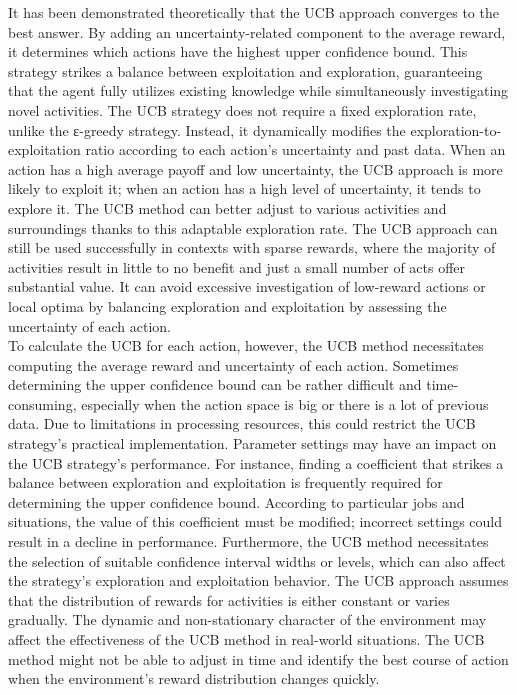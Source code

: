 \documentclass[a4paper,11pt,onecolumn]{article}
\begin{document}
It has been demonstrated theoretically that the UCB approach converges to the best answer. By adding an uncertainty-related component to the average reward, it determines which actions have the highest upper confidence bound. This strategy strikes a balance between exploitation and exploration, guaranteeing that the agent fully utilizes existing knowledge while simultaneously investigating novel activities. The UCB strategy does not require a fixed exploration rate, unlike the ε-greedy strategy.  Instead, it dynamically modifies the exploration-to-exploitation ratio according to each action's uncertainty and past data. When an action has a high average payoff and low uncertainty, the UCB approach is more likely to exploit it; when an action has a high level of uncertainty, it tends to explore it. The UCB method can better adjust to various activities and surroundings thanks to this adaptable exploration rate. The UCB approach can still be used successfully in contexts with sparse rewards, where the majority of activities result in little to no benefit and just a small number of acts offer substantial value. It can avoid excessive investigation of low-reward actions or local optima by balancing exploration and exploitation by assessing the uncertainty of each action.\\
To calculate the UCB for each action, however, the UCB method necessitates computing the average reward and uncertainty of each action. Sometimes determining the upper confidence bound can be rather difficult and time-consuming, especially when the action space is big or there is a lot of previous data. Due to limitations in processing resources, this could restrict the UCB strategy's practical implementation.  Parameter settings may have an impact on the UCB strategy's performance. For instance, finding a coefficient that strikes a balance between exploration and exploitation is frequently required for determining the upper confidence bound. According to particular jobs and situations, the value of this coefficient must be modified; incorrect settings could result in a decline in performance. Furthermore, the UCB method necessitates the selection of suitable confidence interval widths or levels, which can also affect the strategy's exploration and exploitation behavior. The UCB approach assumes that the distribution of rewards for activities is either constant or varies gradually. The dynamic and non-stationary character of the environment may affect the effectiveness of the UCB method in real-world situations. The UCB method might not be able to adjust in time and identify the best course of action when the environment's reward distribution changes quickly.\\
\end{document}
